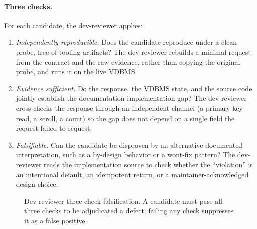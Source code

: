\documentclass[sigconf]{acmart}
\begin{document}
\paragraph{Three checks.}
For each candidate, the dev-reviewer applies:
\begin{enumerate}
  \item \emph{Independently reproducible.} Does the candidate reproduce under a clean probe, free of tooling artifacts? The dev-reviewer rebuilds a minimal request from the contract and the raw evidence, rather than copying the original probe, and runs it on the live VDBMS.
  \item \emph{Evidence sufficient.} Do the response, the VDBMS state, and the source code jointly establish the documentation-implementation gap? The dev-reviewer cross-checks the response through an independent channel (a primary-key read, a scroll, a count) so the gap does not depend on a single field the request failed to request.
  \item \emph{Falsifiable.} Can the candidate be disproven by an alternative documented interpretation, such as a by-design behavior or a wont-fix pattern? The dev-reviewer reads the implementation source to check whether the ``violation'' is an intentional default, an idempotent return, or a maintainer-acknowledged design choice.
\end{enumerate}

\begin{figure}[t]
\centering
{}
\caption{Dev-reviewer three-check falsification. A candidate must pass all three checks to be adjudicated a defect; failing any check suppresses it as a false positive.}
\label{fig:devreviewer}
\end{figure}
\end{document}
